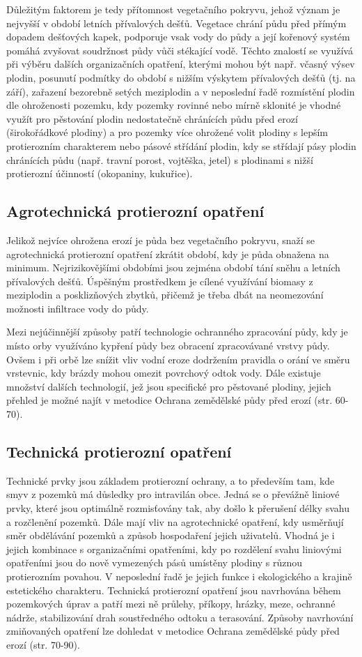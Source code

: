 Důležitým faktorem je tedy přítomnost vegetačního pokryvu, jehož význam je nejvyšší v období letních přívalových dešťů. Vegetace chrání půdu před přímým dopadem dešťových kapek, podporuje vsak vody do půdy a její kořenový systém pomáhá zvyšovat soudržnost půdy vůči stékající vodě. Těchto znalostí se využívá při výběru dalších organizačních opatření, kterými mohou být např. včasný výsev plodin, posunutí podmítky do období s nižším výskytem přívalových dešťů (tj. na září), zařazení bezorebně setých meziplodin a v neposlední řadě rozmístění plodin dle ohroženosti pozemku, kdy pozemky rovinné nebo mírně sklonité je vhodné využít pro pěstování plodin nedostatečně chránících půdu před erozí (širokořádkové plodiny) a pro pozemky více ohrožené volit plodiny s lepším protierozním charakterem nebo pásové střídání plodin, kdy se střídají pásy plodin chránících půdu (např. travní porost, vojtěška, jetel) s plodinami s nižší protierozní účinností (okopaniny, kukuřice).

\subsection{Agrotechnická protierozní opatření}
Jelikož nejvíce ohrožena erozí je půda bez vegetačního pokryvu, snaží se agrotechnická protierozní opatření zkrátit období, kdy je půda obnažena na minimum. Nejrizikovějšími obdobími jsou zejména období tání sněhu a letních přívalových dešťů. Úspěšným prostředkem je cílené využívání biomasy z meziplodin a posklizňových zbytků, přičemž je třeba dbát na neomezování možnosti infiltrace vody do půdy. 

Mezi nejúčinnější způsoby patří technologie ochranného zpracování půdy, kdy je místo orby využíváno kypření půdy bez obracení zpracovávané vrstvy půdy. Ovšem i při orbě lze snížit vliv vodní eroze dodržením pravidla o orání ve směru vrstevnic, kdy brázdy mohou omezit povrchový odtok vody. Dále existuje množství dalších technologií, jež jsou specifické pro pěstované plodiny, jejich přehled je možné najít v metodice Ochrana zemědělské půdy před erozí (str. 60-70).

\subsection{Technická protierozní opatření}
Technické prvky jsou základem protierozní ochrany, a to především tam, kde smyv z pozemků má důsledky pro intravilán obce. Jedná se o převážně liniové prvky, které jsou optimálně rozmisťovány tak, aby došlo k přerušení délky svahu a rozčlenění pozemků. Dále mají vliv na agrotechnické opatření, kdy usměrňují směr obdělávání pozemků a způsob hospodaření jejich uživatelů. Vhodná je i jejich kombinace s organizačními opatřeními, kdy po rozdělení svahu liniovými opatřeními jsou do nově vymezených pásů umístěny plodiny s různou protierozním povahou. V neposlední řadě je jejich funkce i ekologického a krajině estetického charakteru. Technická protierozní opatření jsou navrhována během pozemkových úprav a patří mezi ně průlehy, příkopy, hrázky, meze, ochranné nádrže, stabilizování drah soustředného odtoku a terasování. Způsoby navrhování zmiňovaných opatření lze dohledat v metodice Ochrana zemědělské půdy před erozí (str. 70-90).

